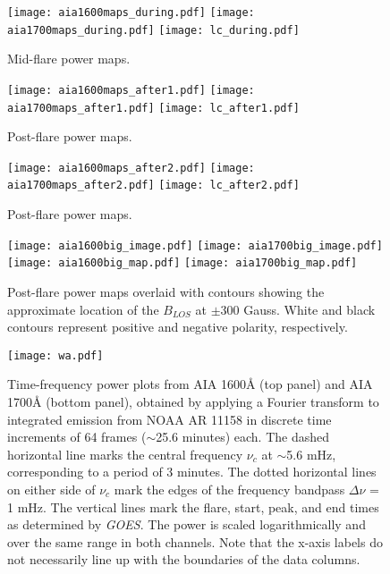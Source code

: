 \begin{figure*}[htb!]\centering
    \texttt{[image: aia1600maps\_during.pdf]}
    \texttt{[image: aia1700maps\_during.pdf]}
    \texttt{[image: lc\_during.pdf]}
    \caption{%
        Mid-flare power maps.
    \label{powermaps_during}}
\end{figure*}

\begin{figure*}[htb!]\centering
    \texttt{[image: aia1600maps\_after1.pdf]}
    \texttt{[image: aia1700maps\_after1.pdf]}
    \texttt{[image: lc\_after1.pdf]}
    \caption{%
        Post-flare power maps.
    \label{powermaps_after1}}
\end{figure*}

\begin{figure*}[htb!]\centering
    \texttt{[image: aia1600maps\_after2.pdf]}
    \texttt{[image: aia1700maps\_after2.pdf]}
    \texttt{[image: lc\_after2.pdf]}
    \caption{%
        Post-flare power maps.
    \label{powermaps_after2}}
\end{figure*}

\begin{figure*}[htb!]\centering
    \texttt{[image: aia1600big\_image.pdf]}
    \texttt{[image: aia1700big\_image.pdf]}\\
    \texttt{[image: aia1600big\_map.pdf]}
    \texttt{[image: aia1700big\_map.pdf]}
    \caption{%
        Post-flare power maps overlaid with contours showing the approximate
        location of the $B_{LOS}$ at $\pm$300 Gauss.
        White and black contours represent positive and negative polarity,
        respectively.
    \label{contours}}
\end{figure*}

\begin{figure*}[htb!]\centering
    \texttt{[image: wa.pdf]}
    \caption{
        Time-frequency power plots from AIA 1600\AA{} (top panel) and AIA
        1700\AA{} (bottom panel), obtained by applying a Fourier transform to
        integrated emission from NOAA AR 11158 in discrete time increments of
        64 frames ($\sim$25.6 minutes) each. The dashed horizontal line marks the
        central frequency $\nu_{c}$ at $\sim$5.6 mHz, corresponding to a period
        of 3 minutes. The dotted horizontal lines on either side of $\nu_{c}$
        mark the edges of the frequency bandpass $\Delta\nu$ = 1 mHz. The
        vertical lines mark the flare, start, peak, and end times as determined
        by \textit{GOES}. The power is scaled logarithmically and over the same
        range in both channels.
        Note that the x-axis labels do not necessarily line up with the
        boundaries of the data columns.
        \label{wa}}
\end{figure*}

